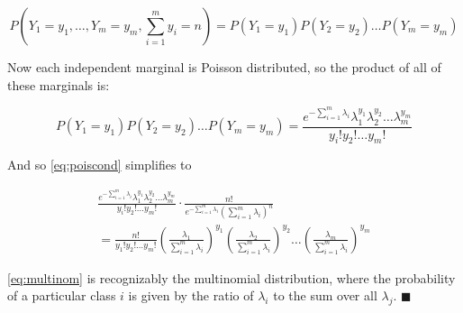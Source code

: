 $$P \left (Y_1 = y_1, \dots, Y_m = y_m, \sum_{i=1}^m y_i = n \right ) = P(Y_1 = y_1) P(Y_2 = y_2) \dots P(Y_m = y_m)$$

Now each independent marginal is Poisson distributed, so the product of all of these marginals is:

$$P(Y_1 = y_1) P(Y_2 = y_2) \dots P(Y_m = y_m) =  \frac{e^{-\sum_{i=1}^m \lambda_i} \lambda_1^{y_1} \lambda_2^{y_2} \dots \lambda_m^{y_m}}{y_i!
  y_2! \dots y_m!}$$

And so \ref{eq:poiscond} simplifies to

\begin{equation}
  \label{eq:multinom}
\begin{split}
  \frac{e^{-\sum_{i=1}^m \lambda_i} \lambda_1^{y_1} \lambda_2^{y_2} \dots \lambda_m^{y_m}}{y_i! y_2! \dots y_m!} \cdot \frac{n!}{e^{-\sum_{i=1}^m
      \lambda_i} (\sum_{i=1}^m \lambda_i)^n} \\
  = \frac{n!}{y_1! y_2! \dots y_m!} \left (\frac{\lambda_1}{\sum_{i=1}^m \lambda_i} \right )^{y_1} \left (\frac{\lambda_2}{\sum_{i=1}^m \lambda_i}
    \right )^{y_2} \dots \left (\frac{\lambda_m}{\sum_{i=1}^m \lambda_i} \right )^{y_m}
  \end{split}
\end{equation}

\ref{eq:multinom} is recognizably the multinomial distribution, where the probability of a particular class $i$ is given by the
ratio of $\lambda_i$ to the sum over all $\lambda_j$. $\blacksquare$
  
